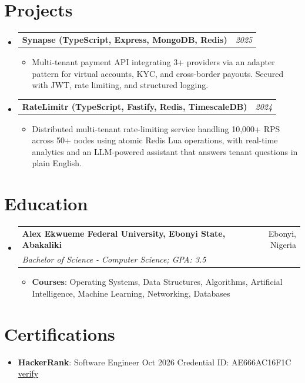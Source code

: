 \documentclass[a4paper]{article}
\makeatletter
\newcommand{\resumeItem}[2]{ \item\small{ \textbf{#1}: #2 } }
\newcommand{\resumeSubheading}[4]{
\vspace{-1pt}
\item[]
\begin{tabular*}{0.97\textwidth}{l@{\extracolsep{\fill}}r}
	\textbf{#1} & #2          \\
	\textit{#3} & \textit{#4} \\
\end{tabular*}
\vspace{1pt}
}
\newcommand{\resumeProjectHeading}[2]{ %
\vspace{2pt}
\item[]
\begin{tabular*}{0.97\textwidth}{l@{\extracolsep{\fill}}r}
	\textbf{#1} & \textit{#2} \\
\end{tabular*}
\vspace{0pt}
}
\newcommand{\resumeSubItem}[2]{\resumeItem{#1}{#2}
\vspace{-8pt}}
\newcommand{\resumeSubHeadingListStart}{\begin{itemize}[leftmargin=*,topsep=1pt]}
\newcommand{\resumeSubHeadingListEnd}{\end{itemize}}
\newcommand{\resumeItemListStart}{\begin{itemize}[topsep=0pt,itemsep=0pt,parsep=0pt]}
\newcommand{\resumeItemListEnd}{\end{itemize}}
\makeatother
\begin{document}
	\section{Projects}
	\resumeSubHeadingListStart
	\resumeProjectHeading{Synapse (TypeScript, Express, MongoDB, Redis)}{2025}
	\resumeItemListStart
	\item\small{Multi-tenant payment API integrating 3+ providers via an adapter pattern for virtual accounts, KYC, and cross-border payouts. Secured with JWT, rate limiting, and structured logging.}
	\resumeItemListEnd
	\resumeProjectHeading{RateLimitr (TypeScript, Fastify, Redis, TimescaleDB)}{2024}
	\resumeItemListStart
	\item\small{Distributed multi-tenant rate-limiting service handling 10,000+ RPS across 50+ nodes using atomic Redis Lua operations, with real-time analytics and an LLM-powered assistant that answers tenant questions in plain English.}
	\resumeItemListEnd
	\resumeSubHeadingListEnd

	\section{Education}
	\resumeSubHeadingListStart
	\resumeSubheading
	{Alex Ekwueme Federal University, Ebonyi State, Abakaliki}{Ebonyi, Nigeria}
	{Bachelor of Science - Computer Science; GPA: 3.5}{}
	\resumeItemListStart
	\resumeItem{Courses}{Operating Systems, Data Structures, Algorithms, Artificial Intelligence, Machine Learning, Networking, Databases}
	\resumeItemListEnd
	\resumeSubHeadingListEnd

	\section{Certifications}
	\resumeSubHeadingListStart
	\resumeSubItem{HackerRank}{Software Engineer \textbullet{} Oct 2026 \textbullet{} Credential ID: AE666AC16F1C \textbullet{} \href{https://www.hackerrank.com/certificates/e4382188f72a}{verify}}
	\resumeSubHeadingListEnd
\end{document}
